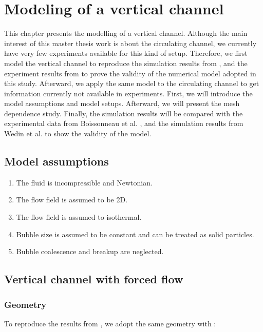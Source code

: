 \chapter{Modeling of a vertical channel}\label{chapter:validation}

 This chapter presents the modelling of a vertical channel. Although the main interest of this master thesis work is about the circulating channel, we currently have very few experiments available for this kind of setup. Therefore, we first model the vertical channel to reproduce the simulation results from \cite{Wedin2001, Schillings2015}, and the experiment results from \cite{Boissonneau2000} to prove the validity of the numerical model adopted in this study. Afterward, we apply the same model to the circulating channel to get information currently not available in experiments. First, we will introduce the model assumptions and model setups. Afterward, we will present the mesh dependence study. Finally, the simulation results will be compared with the experimental data from Boissonneau et al. \cite{Boissonneau2000}, and the simulation results from Wedin et al.\cite{Wedin2001} to show the validity of the model. 

\section{Model assumptions}

\begin{enumerate}
    \item The fluid is incompressible and Newtonian.
    \item The flow field is assumed to be 2D.
    \item The flow field is assumed to isothermal.
    \item Bubble size is assumed to be constant and can be treated as solid particles.
    \item Bubble coalescence and breakup are neglected.
\end{enumerate}


\section{Vertical channel with forced flow}


\subsection{Geometry}

To reproduce the results from \cite{Boissonneau2000, Wedin2001}, we adopt the same geometry with \cite{Boissonneau2000}:

